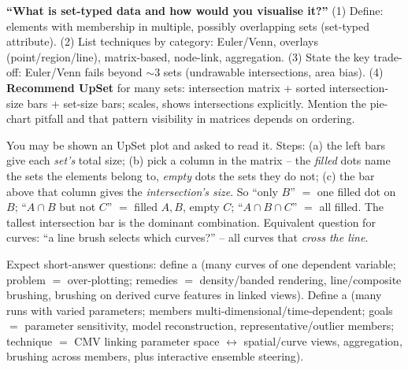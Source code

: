 \begin{exambox}
\textbf{``What is set-typed data and how would you visualise it?''} (1) Define:
elements with membership in multiple, possibly overlapping sets (set-typed
attribute). (2) List techniques by category: Euler/Venn, overlays
(point/region/line), matrix-based, node-link, aggregation. (3) State the
key trade-off: Euler/Venn fails beyond $\sim$3 sets (undrawable
intersections, area bias). (4) \textbf{Recommend UpSet} for many sets:
intersection matrix + sorted intersection-size bars + set-size bars; scales,
shows intersections explicitly. Mention the pie-chart pitfall and that pattern
visibility in matrices depends on ordering.
\end{exambox}

\begin{exambox}
You may be shown an UpSet plot and asked to read it. Steps: (a) the left bars
give each \emph{set's} total size; (b) pick a column in the matrix -- the
\emph{filled} dots name the sets the elements belong to, \emph{empty} dots the
sets they do not; (c) the bar above that column gives the \emph{intersection's
size}. So ``only $B$'' $=$ one filled dot on $B$; ``$A\cap B$ but not $C$'' $=$
filled $A,B$, empty $C$; ``$A\cap B\cap C$'' $=$ all filled. The tallest
intersection bar is the dominant combination. Equivalent question for curves:
``a line brush selects which curves?'' -- all curves that \emph{cross the
line}.
\end{exambox}

\begin{exambox}
Expect short-answer questions: define a 
(many curves of one dependent variable; problem $=$ over-plotting; remedies $=$
density/banded rendering, line/composite brushing, brushing on derived curve
features in linked views). Define a  (many runs with
varied parameters; members multi-dimensional/time-dependent; goals $=$
parameter sensitivity, model reconstruction, representative/outlier members;
technique $=$ CMV linking parameter space $\leftrightarrow$ spatial/curve views,
aggregation, brushing across members, plus interactive ensemble steering).
\end{exambox}
